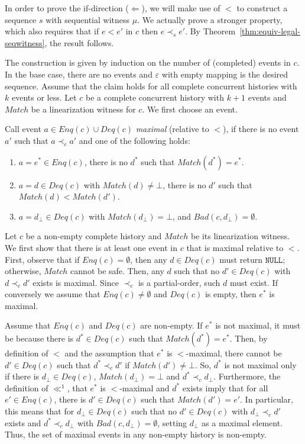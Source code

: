 \documentclass{LMCS}
\newcommand{\NULL}{\ensuremath{\mathtt{NULL}}}
\newcommand{\Match}{\ensuremath{\mathit{Match}}}
\newcommand{\Deq}[1]{\ensuremath{\mathit{Deq}({#1})}}
\newcommand{\Enq}[1]{\ensuremath{\mathit{Enq}({#1})}}
\newcommand{\Bad}[2]{\ensuremath{\mathit{Bad}(#1,#2)}}
\newcommand{\dhat}{\ensuremath{d_{\bot}}}
\begin{document}
In order to prove the if-direction ($\Leftarrow$), we will make use of $<$ to construct a sequence $s$ with sequential witness $\mu$.
We actually prove a stronger property, which also requires that if $e<e'$ in $c$ then $e\prec_s e'$.
By Theorem~\ref{thm:equiv-legal-seqwitness}, the result follows.

The construction is given by induction on the number of (completed) events in $c$.
In the base case, there are no events and $\varepsilon$ with empty mapping is the desired sequence.
Assume that the claim holds for all complete concurrent histories with $k$ events or less.
Let $c$ be a complete concurrent history with $k+1$ events and $\Match$ be a linearization witness for $c$.
We first choose an event.

Call event $a\in \Enq c\cup \Deq c$ {\em maximal} (relative to $<$), if there is no event $a'$ such that $a\prec_c a'$ and one of the following holds:
\begin{enumerate}
\item $a=e^*\in \Enq c$, there is no $d^*$ such that $\Match(d^*)=e^*$.
\item $a=d\in \Deq c$ with $\Match(d)\neq\bot$, there is no $d'$ such that $\Match(d)<\Match(d')$.
\item $a=\dhat\in \Deq c$ with $\Match(\dhat)=\bot$, and $\Bad c {\dhat}=\emptyset$.
\end{enumerate}
Let $c$ be a non-empty complete history and $\Match$ be its linearization witness.
We first show that there is at least one event in $c$ that is maximal relative to $<$.
First, observe that if $\Enq c=\emptyset$, then any $d\in \Deq c$ must return {\NULL}; otherwise, $\Match$ cannot be safe.
Then, any $d$ such that no $d'\in \Deq c$ with $d\prec_c d'$ exists is maximal.
Since $\prec_c$ is a partial-order, such $d$ must exist.
If conversely we assume that $\Enq c\neq\emptyset$ and $\Deq c$ is empty, then $e^*$ is maximal.

Assume that $\Enq c$ and $\Deq c$ are non-empty.
If $e^*$ is not maximal, it must be because there is $d^*\in \Deq c$ such that $\Match(d^*)=e^*$.
Then, by definition of $<$ and the assumption that $e^*$ is $<$-maximal, there cannot be $d'\in \Deq c$ such that $d^*\prec_c d'$ if $\Match(d')\neq\bot$.
So, $d^*$ is not maximal only if there is $\dhat\in \Deq c$, $\Match(\dhat)=\bot$ and $d^*\prec_c \dhat$.
Furthermore, the definition of $\ll^1$, that $e^*$ is $<$-maximal and $d^*$ exists imply that for all $e'\in \Enq c$, there is  $d'\in \Deq c$ such that $\Match(d')=e'$.
In particular, this means that for $\dhat\in \Deq c$ such that no $d'\in \Deq c$ with $\dhat\prec_c d'$ exists and $d^*\prec_c \dhat$ with $\Bad c {\dhat}=\emptyset$, setting $\dhat$ as a maximal element.
Thus, the set of maximal events in any non-empty history is non-empty. 
\end{document}

